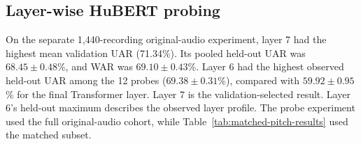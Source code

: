 \subsection{Layer-wise HuBERT probing}

On the separate 1,440-recording original-audio experiment, layer 7 had the
highest mean validation UAR (71.34\%). Its pooled held-out UAR was
$68.45 \pm 0.48$\%, and WAR was $69.10 \pm 0.43$\%. Layer 6 had the highest
observed held-out UAR among the 12 probes ($69.38 \pm 0.31$\%), compared
with $59.92 \pm 0.95$\% for the final Transformer layer. Layer 7 is the
validation-selected result. Layer 6's held-out maximum describes the
observed layer profile. The probe experiment used the full original-audio
cohort, while Table~\ref{tab:matched-pitch-results} used the matched subset.
